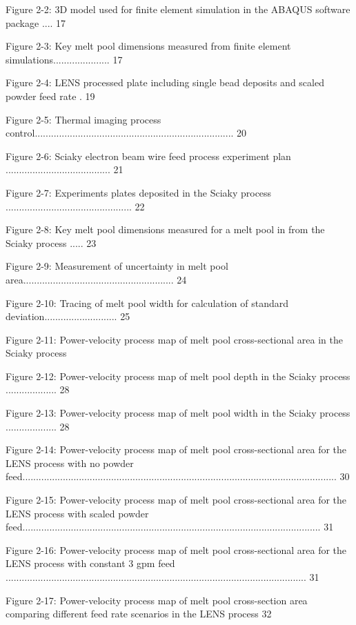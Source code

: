 \documentclass[10pt]{article}
\begin{document}
Figure 2-2: 3D model used for finite element simulation in the ABAQUS software package .... 17

Figure 2-3: Key melt pool dimensions measured from finite element simulations..................... 17

Figure 2-4: LENS processed plate including single bead deposits and scaled powder feed rate . 19

Figure 2-5: Thermal imaging process control.......................................................................... 20

Figure 2-6: Sciaky electron beam wire feed process experiment plan ....................................... 21

Figure 2-7: Experiments plates deposited in the Sciaky process ............................................... 22

Figure 2-8: Key melt pool dimensions measured for a melt pool in from the Sciaky process ..... 23

Figure 2-9: Measurement of uncertainty in melt pool area........................................................ 24

Figure 2-10: Tracing of melt pool width for calculation of standard deviation........................... 25

Figure 2-11: Power-velocity process map of melt pool cross-sectional area in the Sciaky process

Figure 2-12: Power-velocity process map of melt pool depth in the Sciaky process ................... 28

Figure 2-13: Power-velocity process map of melt pool width in the Sciaky process ................... 28

Figure 2-14: Power-velocity process map of melt pool cross-sectional area for the LENS process with no powder feed..................................................................................................................... 30

Figure 2-15: Power-velocity process map of melt pool cross-sectional area for the LENS process with scaled powder feed............................................................................................................... 31

Figure 2-16: Power-velocity process map of melt pool cross-sectional area for the LENS process with constant 3 gpm feed ................................................................................................................ 31

Figure 2-17: Power-velocity process map of melt pool cross-section area comparing different feed rate scenarios in the LENS process 32
\end{document}
